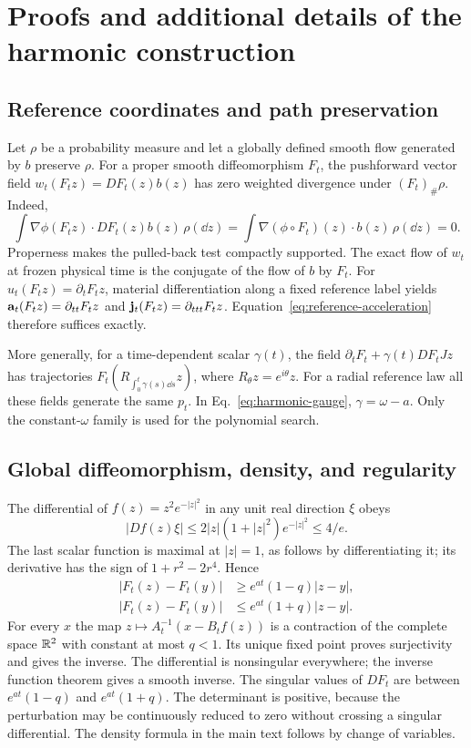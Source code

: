 \section{Proofs and additional details of the harmonic construction}
\label{app:harmonic-proofs}

\subsection{Reference coordinates and path preservation}

Let $\rho$ be a probability measure and let a globally defined smooth
flow generated by $b$ preserve $\rho$. For a proper smooth diffeomorphism
$F_t$, the pushforward vector field $w_t(F_tz)=DF_t(z)b(z)$ has zero
weighted divergence under $(F_t)_\#\rho$. Indeed,
\[
 \int\nabla\phi(F_tz)\cdot DF_t(z)b(z)\,\rho(\dd z)
 =\int\nabla(\phi\circ F_t)(z)\cdot b(z)\,\rho(\dd z)=0.
\]
Properness makes the pulled-back test compactly supported. The exact
flow of $w_t$ at frozen physical time is the conjugate of the flow of
$b$ by $F_t$. For $u_t(F_tz)=\partial_tF_tz$, material differentiation
along a fixed reference label yields
$\mathbf a_t(F_tz)=\partial_{tt}F_tz$ and
$\mathbf j_t(F_tz)=\partial_{ttt}F_tz$.
Equation~\eqref{eq:reference-acceleration} therefore suffices exactly.

More generally, for a time-dependent scalar $\gamma(t)$, the field
$\partial_tF_t+\gamma(t)DF_tJz$ has trajectories
$F_t(R_{\int_0^t\gamma(s)\dd s}z)$, where $R_\theta z=e^{i\theta}z$.
For a radial reference law all these fields generate the same $p_t$.
In Eq.~\eqref{eq:harmonic-gauge}, $\gamma=\omega-a$.
Only the constant-$\omega$ family is used for the polynomial search.

\subsection{Global diffeomorphism, density, and regularity}

The differential of $f(z)=z^2e^{-|z|^2}$ in any unit real direction
$\xi$ obeys
\[
 |Df(z)\xi|
 \le 2|z|(1+|z|^2)e^{-|z|^2}\le4/e.
\]
The last scalar function is maximal at $|z|=1$, as follows by
differentiating it; its derivative has the sign of
$1+r^2-2r^4$. Hence
\begin{align*}
 |F_t(z)-F_t(y)|
 &\ge e^{at}(1-q)|z-y|,\\
 |F_t(z)-F_t(y)|
 &\le e^{at}(1+q)|z-y|.
\end{align*}
For every $x$ the map $z\mapsto A_t^{-1}(x-B_tf(z))$ is a contraction
of the complete space $\mathbb R^2$ with constant at most $q<1$. Its unique
fixed point proves surjectivity and gives the inverse. The differential
is nonsingular everywhere; the inverse function theorem gives a smooth
inverse. The singular values of $DF_t$ are between
$e^{at}(1-q)$ and $e^{at}(1+q)$. The determinant is positive, because
the perturbation may be continuously reduced to zero without crossing
a singular differential. The density formula in the main text follows
by change of variables.

